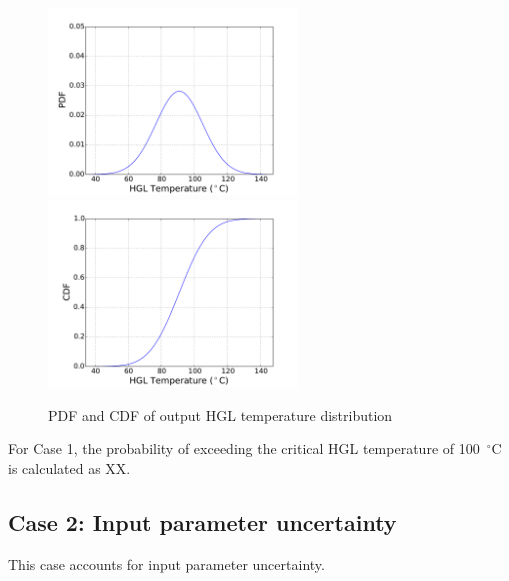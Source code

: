 \documentclass[12pt]{article}
\begin{document}
\begin{figure}[!ht]
\includegraphics[width=2.6in]{Figures/output_PDF_1_model}
\includegraphics[width=2.6in]{Figures/output_CDF_1_model}
\caption{PDF and CDF of output HGL temperature distribution}
\label{fig:case_1_output_distributions}
\end{figure}

For Case 1, the probability of exceeding the critical HGL temperature of 100~$^\circ$C is calculated as XX.

\subsection{Case 2: Input parameter uncertainty}

This case accounts for input parameter uncertainty.
\end{document}
